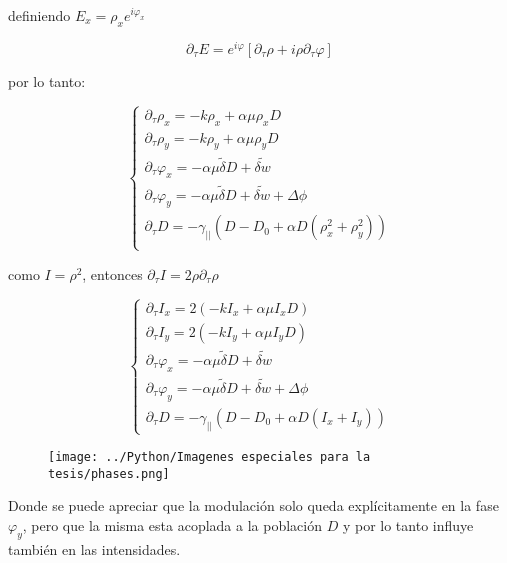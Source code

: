 	definiendo $E_x=\rho_xe^{i\varphi_x}$
	
	\[ \partial_{\tau}E=e^{i\varphi}[\partial_{\tau}\rho + i \rho \partial_{\tau}\varphi]
	\]
	
	
	por lo tanto:
	
	\[
	\begin{cases}
	\partial_{\tau} \rho_x=-k \rho_x + \alpha \mu\rho_x D \\
	\partial_{\tau} \rho_y=-k \rho_y + \alpha \mu \rho_y D \\
	\partial_{\tau} \varphi_x=-\alpha \mu \tilde{\delta} D +\tilde{\delta w}\\
	\partial_{\tau} \varphi_y=-\alpha \mu \tilde{\delta} D +\tilde{\delta w}+\Delta \phi \\
	\partial_{\tau} D=-\gamma_{||}(D-D_0+\alpha D (\rho^2_x + \rho_y^2)) \\
	\end{cases}
	\]
	
	como $I=\rho^2$, entonces $\partial_{\tau} I= 2\rho \partial_{\tau}\rho$
	
	\begin{equation}
		\begin{cases}
			\partial_{\tau} I_x= 2(-k I_x + \alpha \mu I_x D) \\
			\partial_{\tau} I_y= 2(-k I_y + \alpha \mu I_y D) \\
			\partial_{\tau} \varphi_x=-\alpha \mu \tilde{\delta} D +\tilde{\delta w}\\
			\partial_{\tau} \varphi_y=-\alpha \mu \tilde{\delta} D +\tilde{\delta w}+\Delta \phi \\
			\partial_{\tau} D=-\gamma_{||}(D-D_0+\alpha D (I_x + I_y)) 
		\end{cases}
	\end{equation}
	\label{eq: elim adiabatica int}
	
	\begin{figure}[htp]
		\begin{center}
			\texttt{[image: ../Python/Imagenes especiales para la tesis/phases.png]}
			\label{fig: phases}
		\end{center}
	\end{figure}
	
	Donde se puede apreciar que la modulación solo queda explícitamente en la fase $\varphi_y$, pero que la misma esta acoplada a la población $D$ y por lo tanto influye también en las intensidades.
	
